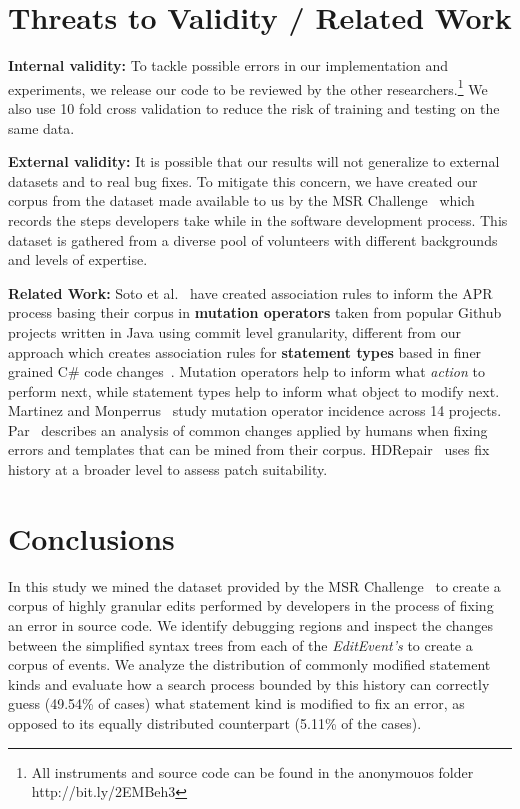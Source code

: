 \documentclass[sigconf]{acmart}
\begin{document}
\section{Threats to Validity / Related Work} \label{threatsVal}

\noindent\textbf{Internal validity:}
To tackle possible errors in our implementation and experiments, we release our code
to be reviewed by the other researchers.\footnote{All instruments
and source code can be found in the anonymouos folder 
http://bit.ly/2EMBeh3} 
We also use 10 fold cross validation 
to reduce the risk of training and testing on the same data.  

\noindent\textbf{External validity:} 
It is possible 
that our results will not generalize to external datasets and to
real bug fixes. To mitigate this concern, we have created our corpus 
from the dataset made available to us by the MSR Challenge~\cite{msr18challenge}
which records the steps developers take while in the software development process.
This dataset is gathered from a diverse pool of volunteers with different 
backgrounds and levels of expertise.

\noindent\textbf{Related Work:} 
Soto et al.~\cite{Soto18} have created association rules to inform the APR
process basing their corpus in \textbf{mutation operators} taken from popular Github projects
written in Java using commit level granularity, 
different from our approach which creates association rules for \textbf{statement types} 
based in finer grained C\# code changes~\cite{msr18challenge}. Mutation operators help to 
inform what \textit{action} to perform next, while statement types help to inform what
object to modify next. 
Martinez and
Monperrus~\cite{martinez15} study mutation operator incidence across 
14 projects. Par~\cite{kim2013} describes an analysis of common changes
applied by humans when fixing errors and templates that can be mined from
their corpus. HDRepair~\cite{xuan16} 
uses fix history at a broader level
to assess patch suitability.


\section{Conclusions}
\label{conclusions}
In this study we mined the dataset provided by the MSR Challenge~\cite{msr18challenge}
to create a corpus of highly granular edits performed by developers in the process
of fixing an error in source code. We identify debugging
regions and inspect the changes between the simplified 
syntax trees from each
of the \textit{EditEvent's} to create a corpus of 
events.
We analyze the distribution of commonly modified statement kinds and evaluate
how a search process bounded by this history can correctly guess (49.54\% of 
cases) what statement kind is modified to fix an error, as opposed to its
equally distributed counterpart (5.11\% of the cases).
\end{document}
